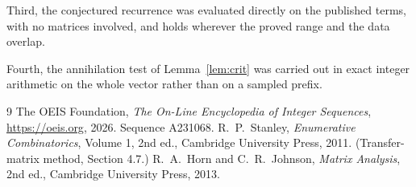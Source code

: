 \documentclass[11pt,a4paper]{article}
\theoremstyle{plain}
\theoremstyle{definition}
\begin{document}
Third, the conjectured recurrence was evaluated directly on the published terms, with no
matrices involved, and holds wherever the proved range and the data overlap.

Fourth, the annihilation test of Lemma~\ref{lem:crit} was carried out in exact integer
arithmetic on the whole vector rather than on a sampled prefix.

\begin{thebibliography}{9}
 The OEIS Foundation, \emph{The On-Line Encyclopedia of Integer
Sequences}, \url{https://oeis.org}, 2026. Sequence A231068.
 R.~P.~Stanley, \emph{Enumerative Combinatorics}, Volume 1, 2nd ed.,
Cambridge University Press, 2011. (Transfer-matrix method, Section 4.7.)
 R.~A.~Horn and C.~R.~Johnson, \emph{Matrix Analysis}, 2nd ed., Cambridge
University Press, 2013.
\end{thebibliography}
\end{document}
